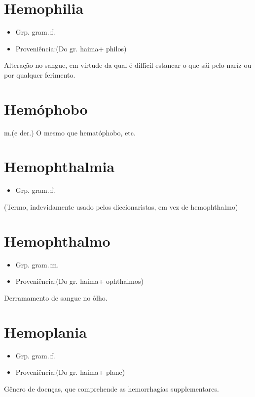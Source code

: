 \documentclass{article}
\begin{document}
\section{Hemophilia}
\begin{itemize}
\item {Grp. gram.:f.}
\end{itemize}
\begin{itemize}
\item {Proveniência:(Do gr. \textunderscore haima\textunderscore  + \textunderscore philos\textunderscore )}
\end{itemize}
Alteração no sangue, em virtude da qual é diffícil estancar o que sái pelo naríz ou por qualquer ferimento.
\section{Hemóphobo}
\textunderscore m.\textunderscore  (e der.)
O mesmo que \textunderscore hematóphobo\textunderscore , etc.
\section{Hemophthalmia}
\begin{itemize}
\item {Grp. gram.:f.}
\end{itemize}
(Termo, indevidamente usado pelos diccionaristas, em vez de \textunderscore hemophthalmo\textunderscore )
\section{Hemophthalmo}
\begin{itemize}
\item {Grp. gram.:m.}
\end{itemize}
\begin{itemize}
\item {Proveniência:(Do gr. \textunderscore haima\textunderscore  + \textunderscore ophthalmos\textunderscore )}
\end{itemize}
Derramamento de sangue no ôlho.
\section{Hemoplania}
\begin{itemize}
\item {Grp. gram.:f.}
\end{itemize}
\begin{itemize}
\item {Proveniência:(Do gr. \textunderscore haima\textunderscore  + \textunderscore plane\textunderscore )}
\end{itemize}
Gênero de doenças, que comprehende as hemorrhagias supplementares.
\end{document}
